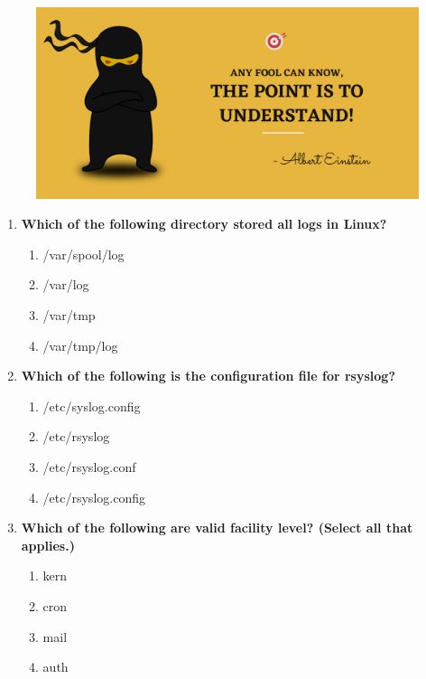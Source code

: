 \setlength{\columnsep}{3pt}
\begin{flushleft}
	
	\paragraph{}
	\bigskip
	
	\begin{figure}[h!]
		\centering
		\includegraphics[scale=.2]{content/practise.jpg}
	\end{figure}	
	\begin{enumerate}
		
		\item \textbf{Which of the following directory stored all logs in Linux?}
		\begin{enumerate}[label=(\alph*)]
			\item /var/spool/log
			\item /var/log   %
			\item /var/tmp  
			\item /var/tmp/log
		\end{enumerate}
		\bigskip
		\bigskip	
		

		\item \textbf{Which of the following is the configuration file for rsyslog?}
		\begin{enumerate}[label=(\alph*)]
			\item /etc/syslog.config
			\item /etc/rsyslog
			\item /etc/rsyslog.conf     %
			\item /etc/rsyslog.config
		\end{enumerate}
		\bigskip
		\bigskip	
		
		\item \textbf{Which of the following are valid facility level? (Select all that applies.)}
		\begin{enumerate}[label=(\alph*)]
			\item kern   %
			\item cron  %
			\item mail  %
			\item auth   %
		\end{enumerate}
		\bigskip
		\bigskip	
		

\end{enumerate}
\end{flushleft}
